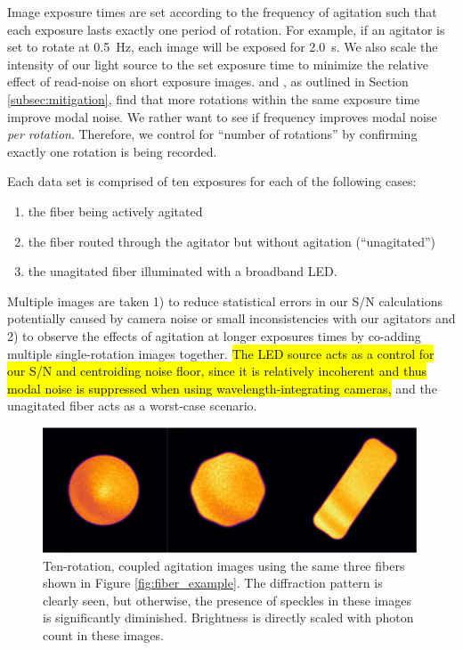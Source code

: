 \documentclass[twocolumn]{emulateapj}
\begin{document}
Image exposure times are set according to the frequency of agitation such that each exposure lasts exactly one period of rotation. For example, if an agitator is set to rotate at \SI{0.5}{\hertz}, each image will be exposed for \SI{2.0}{\second}. We also scale the intensity of our light source to the set exposure time to minimize the relative effect of read-noise on short exposure images. \citet{Baudrand2001} and \citet{Lemke2011}, as outlined in Section \ref{subsec:mitigation}, find that more rotations within the same exposure time improve modal noise. We rather want to see if frequency improves modal noise \textit{per rotation}. Therefore, we control for ``number of rotations'' by confirming exactly one rotation is being recorded.

Each data set is comprised of ten exposures for each of the following cases:
\begin{enumerate}
\item the fiber being actively agitated
\item the fiber routed through the agitator but without agitation (``unagitated'')
\item the unagitated fiber illuminated with a broadband LED.
\end{enumerate}
Multiple images are taken 1) to reduce statistical errors in our S/N calculations potentially caused by camera noise or small inconsistencies with our agitators and 2) to observe the effects of agitation at longer exposures times by co-adding multiple single-rotation images together. \hl{The LED source acts as a control for our S/N and centroiding noise floor, since it is relatively incoherent and thus modal noise is suppressed when using wavelength-integrating cameras,} and the unagitated fiber acts as a worst-case scenario.

\begin{figure}
\centering
	\includegraphics[width=\columnwidth]{images/fiber_improved.pdf}
	\caption{Ten-rotation, coupled agitation images using the same three fibers shown in Figure \ref{fig:fiber_example}.  The diffraction pattern is clearly seen, but otherwise, the presence of speckles in these images is significantly diminished. Brightness is directly scaled with photon count in these images.}
\label{fig:fiber_improved}
\end{figure}
\end{document}

